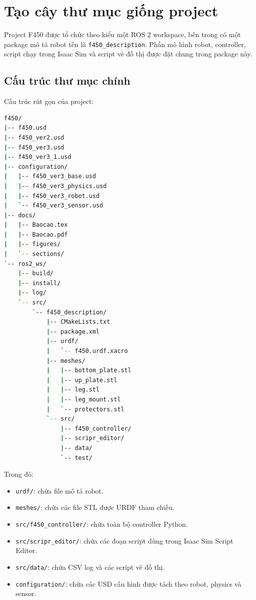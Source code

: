 \section{Tạo cây thư mục giống project}

Project F450 được tổ chức theo kiểu một ROS 2 workspace, bên trong có một
package mô tả robot tên là \texttt{f450\_description}. Phần mô hình robot,
controller, script chạy trong Isaac Sim và script vẽ đồ thị được đặt chung
trong package này.

\subsection{Cấu trúc thư mục chính}

Cấu trúc rút gọn của project:

\begin{lstlisting}[language=bash]
f450/
|-- f450.usd
|-- f450_ver2.usd
|-- f450_ver3.usd
|-- f450_ver3_1.usd
|-- configuration/
|   |-- f450_ver3_base.usd
|   |-- f450_ver3_physics.usd
|   |-- f450_ver3_robot.usd
|   `-- f450_ver3_sensor.usd
|-- docs/
|   |-- Baocao.tex
|   |-- Baocao.pdf
|   |-- figures/
|   `-- sections/
`-- ros2_ws/
    |-- build/
    |-- install/
    |-- log/
    `-- src/
        `-- f450_description/
            |-- CMakeLists.txt
            |-- package.xml
            |-- urdf/
            |   `-- f450.urdf.xacro
            |-- meshes/
            |   |-- bottom_plate.stl
            |   |-- up_plate.stl
            |   |-- leg.stl
            |   |-- leg_mount.stl
            |   `-- protectors.stl
            `-- src/
                |-- f450_controller/
                |-- scripr_editor/
                |-- data/
                `-- test/
\end{lstlisting}

Trong đó:

\begin{itemize}
    \item \texttt{urdf/}: chứa file mô tả robot.
    \item \texttt{meshes/}: chứa các file STL được URDF tham chiếu.
    \item \texttt{src/f450\_controller/}: chứa toàn bộ controller Python.
    \item \texttt{src/scripr\_editor/}: chứa các đoạn script dùng trong Isaac
    Sim Script Editor.
    \item \texttt{src/data/}: chứa CSV log và các script vẽ đồ thị.
    \item \texttt{configuration/}: chứa các USD cấu hình được tách theo robot,
    physics và sensor.
\end{itemize}

